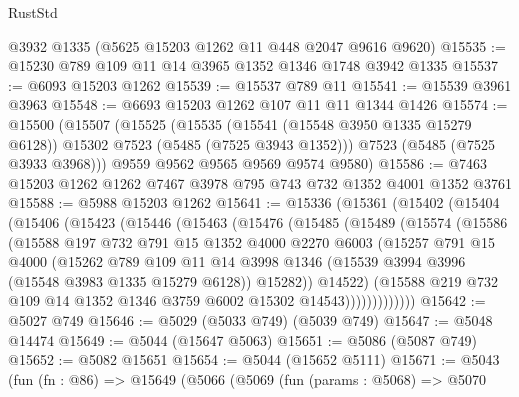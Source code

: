 \begin{lexlean}{RustStd}
\begin{coremodule}
    @3932
    @1335
    (@5625 @15203 @1262 @11 @448 @2047 @9616 @9620)
@15535 := @15230 @789 @109 @11 @14 @3965 @1352 @1346 @1748 @3942 @1335
@15537 := @6093 @15203 @1262
@15539 := @15537 @789 @11
@15541 := @15539 @3961 @3963
@15548 := @6693 @15203 @1262 @107 @11 @11 @1344 @1426
@15574 := @15500
    (@15507
      (@15525
        (@15535 (@15541 (@15548 @3950 @1335 @15279 @6128)) @15302 @7523 (@5485 (@7525 @3943 @1352)))
        @7523
        (@5485 (@7525 @3933 @3968)))
      @9559
      @9562
      @9565
      @9569
      @9574
      @9580)
@15586 := @7463 @15203 @1262 @1262 @7467 @3978 @795 @743 @732 @1352 @4001 @1352 @3761
@15588 := @5988 @15203 @1262
@15641 := @15336
    (@15361
      (@15402
        (@15404
          (@15406
            (@15423
              (@15446
                (@15463
                  (@15476
                    (@15485
                      (@15489
                        (@15574
                          (@15586
                            (@15588
                              @197
                              @732
                              @791
                              @15
                              @1352
                              @4000
                              @2270
                              @6003
                              (@15257
                                @791
                                @15
                                @4000
                                (@15262
                                  @789
                                  @109
                                  @11
                                  @14
                                  @3998
                                  @1346
                                  (@15539 @3994 @3996 (@15548 @3983 @1335 @15279 @6128))
                                  @15282))
                              @14522)
                            (@15588
                              @219
                              @732
                              @109
                              @14
                              @1352
                              @1346
                              @3759
                              @6002
                              @15302
                              @14543)))))))))))))
@15642 := @5027 @749
@15646 := @5029 (@5033 @749) (@5039 @749)
@15647 := @5048 @14474
@15649 := @5044 (@15647 @5063)
@15651 := @5086 (@5087 @749)
@15652 := @5082 @15651
@15654 := @5044 (@15652 @5111)
@15671 := @5043
    (fun (fn : @86) =>
    @15649
      (@5066
        (@5069
          (fun (params : @5068) =>
          @5070

\end{coremodule}
\end{lexlean}

